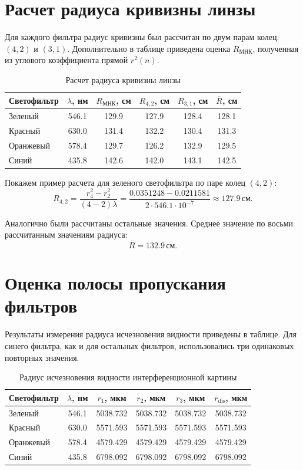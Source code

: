 \documentclass[12pt,a4paper]{article}
\newcommand{\cm}{\ensuremath{\,\text{см}}}
\begin{document}
\section{Расчет радиуса кривизны линзы}

Для каждого фильтра радиус кривизны был рассчитан по двум парам колец: $(4,2)$ и $(3,1)$. Дополнительно в таблице приведена оценка $R_{\text{МНК}}$, полученная из углового коэффициента прямой $r^2(n)$.

\begin{table}[H]
\centering
\small
\caption{Расчет радиуса кривизны линзы}
\begin{tabular}{lccccc}
\toprule
Светофильтр & $\lambda$, нм & $R_{\text{МНК}}$, см & $R_{4,2}$, см & $R_{3,1}$, см & $\overline R$, см \\
\midrule
Зеленый & 546.1 & 129.9 & 127.9 & 128.4 & 128.1 \\
Красный & 630.0 & 131.4 & 132.2 & 130.4 & 131.3 \\
Оранжевый & 578.4 & 129.7 & 126.2 & 132.9 & 129.5 \\
Синий & 435.8 & 142.6 & 142.0 & 143.1 & 142.5 \\
\bottomrule
\end{tabular}
\end{table}

Покажем пример расчета для зеленого светофильтра по паре колец $(4,2)$:
\begin{equation}
    R_{4,2}=\frac{r_4^2-r_2^2}{(4-2)\lambda}
    =\frac{0.0351248-0.0211581}{2\cdot 546.1\cdot 10^{-7}}
    \approx 127.9\cm.
\end{equation}

Аналогично были рассчитаны остальные значения. Среднее значение по восьми рассчитанным значениям радиуса:
\begin{equation}
    \overline R = 132.9\cm.
\end{equation}

\section{Оценка полосы пропускания фильтров}

Результаты измерения радиуса исчезновения видности приведены в таблице. Для синего фильтра, как и для остальных фильтров, использовались три одинаковых повторных значения.

\begin{table}[H]
\centering
\small
\caption{Радиус исчезновения видности интерференционной картины}
\begin{tabular}{lccccc}
\toprule
Светофильтр & $\lambda$, нм & $r_1$, мкм & $r_2$, мкм & $r_3$, мкм & $\overline r_{\text{dis}}$, мкм \\
\midrule
Зеленый & 546.1 & 5038.732 & 5038.732 & 5038.732 & 5038.732 \\
Красный & 630.0 & 5571.593 & 5571.593 & 5571.593 & 5571.593 \\
Оранжевый & 578.4 & 4579.429 & 4579.429 & 4579.429 & 4579.429 \\
Синий & 435.8 & 6798.092 & 6798.092 & 6798.092 & 6798.092 \\
\bottomrule
\end{tabular}
\end{table}
\end{document}
